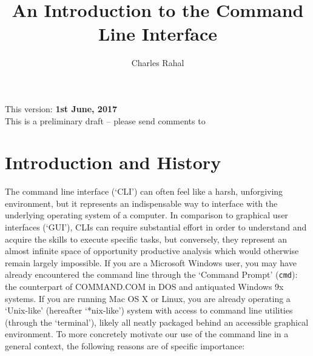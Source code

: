 \documentclass[11pt]{article}
\begin{document}
	
\renewcommand*{\thefootnote}{\fnsymbol{footnote}}
\title{\LARGE{An Introduction to the Command \\ Line Interface}}

\author{Charles Rahal}

\renewcommand\Authands{ and }


\date{}
\maketitle

\begin{center}
This version: \color{Blue}\textbf{1st June, 2017}\color{black}\\ \vspace{0.15in}
This is a preliminary draft -- please send comments to 
\end{center}

\section{Introduction and History}

The command line interface (`CLI')  can often feel like a harsh, unforgiving environment, but it represents an indispensable way to interface with the underlying operating system of a computer. In comparison to graphical user interfaces (`GUI'), CLIs can require substantial effort in order to understand and acquire the skills to execute specific tasks, but conversely, they represent an almost infinite space of opportunity productive analysis which would otherwise remain largely impossible. If you are a Microsoft Windows user, you may have already encountered the command line through the `Command Prompt' (\texttt{cmd}): the counterpart of COMMAND.COM in DOS and antiquated Windows 9x systems. If you are running Mac OS X or Linux, you are already operating a `Unix-like' (hereafter `*nix-like') system with access to command line utilities (through the `terminal'), likely all neatly packaged behind an accessible graphical environment. To more concretely motivate our use of the command line in a general context, the following reasons are of specific importance:
\end{document}

